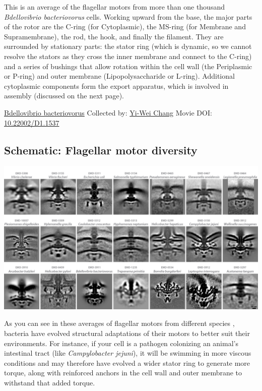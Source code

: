 \documentclass[]{tufte-book}
\begin{document}
This is an average of the flagellar motors from more than one thousand \emph{Bdellovibrio bacteriovorus} cells. Working upward from the base, the major parts of the rotor are the C-ring (for Cytoplasmic), the MS-ring (for Membrane and Supramembrane), the rod, the hook, and finally the filament. They are surrounded by stationary parts: the stator ring (which is dynamic, so we cannot resolve the stators as they cross the inner membrane and connect to the C-ring) and a series of bushings that allow rotation within the cell wall (the Periplasmic or P-ring) and outer membrane (Lipopolysaccharide or L-ring). Additional cytoplasmic components form the export apparatus, which is involved in assembly (discussed on the next page).



\hypertarget{htmlwidget-66542e70f723179e870c}{}

\label{fig:6-2a}\protect\hyperlink{tree}{Bdellovibrio bacteriovorus} Collected by: \protect\hyperlink{yi-wei_chang}{Yi-Wei Chang} Movie DOI: \href{https://doi.org/10.22002/D1.1537}{10.22002/D1.1537}

\hypertarget{Flagellar_motor_diversity}{%
\subsection*{Schematic: Flagellar motor diversity}\label{Flagellar_motor_diversity}}

\includegraphics{img/schematics/6_2_1}

As you can see in these averages of flagellar motors from different species \citep{murphy2006} \citep{chen2011} \citep{zhao2014} \citep{beeby2016} \citep{qin2017} \citep{chaban2018} \citep{kaplan2019} \citep{ferreira2019} \citep{chang2019}, bacteria have evolved structural adaptations of their motors to better suit their environments. For instance, if your cell is a pathogen colonizing an animal's intestinal tract (like \emph{Campylobacter jejuni}), it will be swimming in more viscous conditions and may therefore have evolved a wider stator ring to generate more torque, along with reinforced anchors in the cell wall and outer membrane to withstand that added torque.
\end{document}

